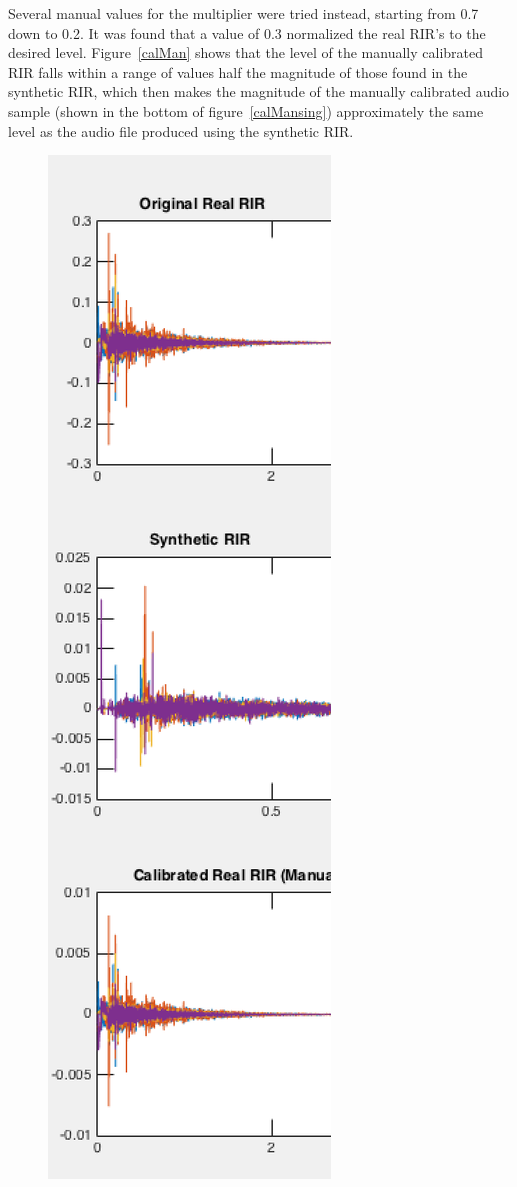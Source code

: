 \documentclass[../../main.tex]{subfiles}
\begin{document}
			Several manual values for the multiplier were tried instead, starting from 0.7 down to 0.2. It was found that a value of 0.3 normalized the real \ac{RIR}'s to the desired level. Figure~\ref{calMan} shows that the level of the manually calibrated RIR falls within a range of values half the magnitude of those found in the synthetic RIR, which then makes the magnitude of the manually calibrated audio sample (shown in the bottom of figure~\ref{calMansing}) approximately the same level as the audio file produced using the synthetic \ac{RIR}.			

			\begin{figure}[H]
				\begin{center}
					\includegraphics[scale = 0.3]{Sections/Implementation/RealRIRs/images/calibration/CalMan_RIR_edit.png} 

\end{center}
\end{figure}
\end{document}
